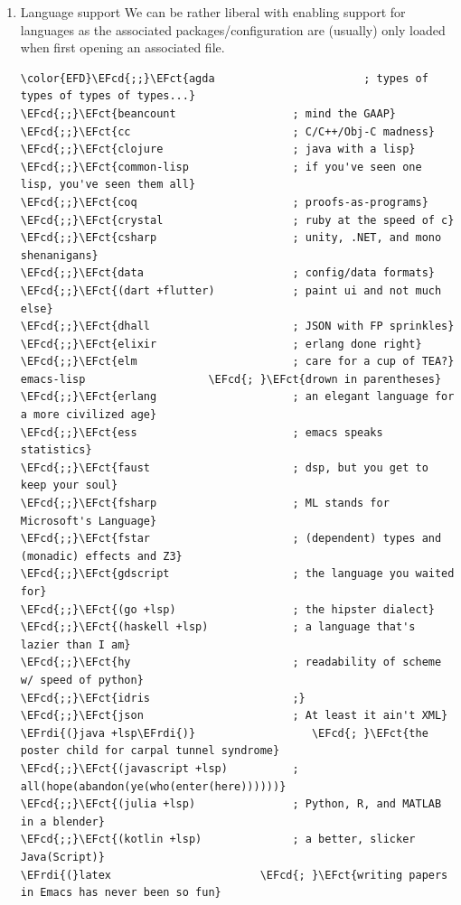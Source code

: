 \documentclass{scrartcl}
\newcommand{\EFct}[1]{\textcolor{EFct}{#1}} %
\newcommand{\EFcd}[1]{\textcolor{EFcd}{#1}} %
\newcommand{\EFrdi}[1]{\textcolor{EFrdi}{#1}} %
\begin{document}
\begin{enumerate}
\item Language support
\label{sec:org5f0033f}
We can be rather liberal with enabling support for languages as the associated
packages/configuration are (usually) only loaded when first opening an
associated file.

\begin{Code}
\begin{Verbatim}[]
\color{EFD}\EFcd{;;}\EFct{agda                       ; types of types of types of types...}
\EFcd{;;}\EFct{beancount                  ; mind the GAAP}
\EFcd{;;}\EFct{cc                         ; C/C++/Obj-C madness}
\EFcd{;;}\EFct{clojure                    ; java with a lisp}
\EFcd{;;}\EFct{common-lisp                ; if you've seen one lisp, you've seen them all}
\EFcd{;;}\EFct{coq                        ; proofs-as-programs}
\EFcd{;;}\EFct{crystal                    ; ruby at the speed of c}
\EFcd{;;}\EFct{csharp                     ; unity, .NET, and mono shenanigans}
\EFcd{;;}\EFct{data                       ; config/data formats}
\EFcd{;;}\EFct{(dart +flutter)            ; paint ui and not much else}
\EFcd{;;}\EFct{dhall                      ; JSON with FP sprinkles}
\EFcd{;;}\EFct{elixir                     ; erlang done right}
\EFcd{;;}\EFct{elm                        ; care for a cup of TEA?}
emacs-lisp                   \EFcd{; }\EFct{drown in parentheses}
\EFcd{;;}\EFct{erlang                     ; an elegant language for a more civilized age}
\EFcd{;;}\EFct{ess                        ; emacs speaks statistics}
\EFcd{;;}\EFct{faust                      ; dsp, but you get to keep your soul}
\EFcd{;;}\EFct{fsharp                     ; ML stands for Microsoft's Language}
\EFcd{;;}\EFct{fstar                      ; (dependent) types and (monadic) effects and Z3}
\EFcd{;;}\EFct{gdscript                   ; the language you waited for}
\EFcd{;;}\EFct{(go +lsp)                  ; the hipster dialect}
\EFcd{;;}\EFct{(haskell +lsp)             ; a language that's lazier than I am}
\EFcd{;;}\EFct{hy                         ; readability of scheme w/ speed of python}
\EFcd{;;}\EFct{idris                      ;}
\EFcd{;;}\EFct{json                       ; At least it ain't XML}
\EFrdi{(}java +lsp\EFrdi{)}                  \EFcd{; }\EFct{the poster child for carpal tunnel syndrome}
\EFcd{;;}\EFct{(javascript +lsp)          ; all(hope(abandon(ye(who(enter(here))))))}
\EFcd{;;}\EFct{(julia +lsp)               ; Python, R, and MATLAB in a blender}
\EFcd{;;}\EFct{(kotlin +lsp)              ; a better, slicker Java(Script)}
\EFrdi{(}latex                       \EFcd{; }\EFct{writing papers in Emacs has never been so fun}

\end{Verbatim}
\end{Code}
\end{enumerate}
\end{document}
